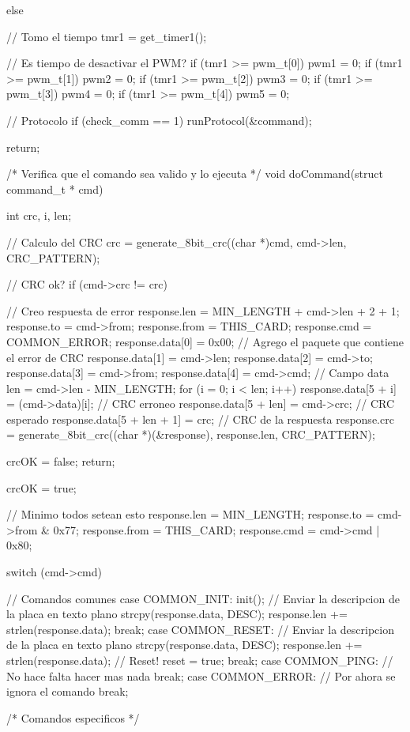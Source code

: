 {\begin{verbatimtab}
{{{		} else {
			// Tomo el tiempo
			tmr1 = get_timer1();

			// Es tiempo de desactivar el PWM?
			if (tmr1 >= pwm_t[0])
				pwm1 = 0;
			if (tmr1 >= pwm_t[1])
				pwm2 = 0;
			if (tmr1 >= pwm_t[2])
				pwm3 = 0;
			if (tmr1 >= pwm_t[3])
				pwm4 = 0;
			if (tmr1 >= pwm_t[4])
				pwm5 = 0;
		}
		
		// Protocolo
		if (check_comm == 1)
			runProtocol(&command);
	}

	return;
}

/* Verifica que el comando sea valido y lo ejecuta */
void doCommand(struct command_t * cmd)
{
	int crc, i, len;
		
	// Calculo del CRC
	crc = generate_8bit_crc((char *)cmd, cmd->len, CRC_PATTERN);
	
	// CRC ok?
	if (cmd->crc != crc)
	{		
		// Creo respuesta de error
		response.len = MIN_LENGTH + cmd->len + 2 + 1;
		response.to = cmd->from;
		response.from = THIS_CARD;
		response.cmd = COMMON_ERROR;
		response.data[0] = 0x00;
		// Agrego el paquete que contiene el error de CRC
		response.data[1] = cmd->len;
		response.data[2] = cmd->to;
		response.data[3] = cmd->from;
		response.data[4] = cmd->cmd;
		// Campo data
		len = cmd->len - MIN_LENGTH;
		for (i = 0; i < len; i++)
			response.data[5 + i] = (cmd->data)[i];
		// CRC erroneo
		response.data[5 + len] = cmd->crc;
		// CRC esperado
		response.data[5 + len + 1] = crc;
		// CRC de la respuesta
		response.crc = generate_8bit_crc((char *)(&response), response.len, CRC_PATTERN);
	
		crcOK = false;
		return;
	}

	crcOK = true;
	
	// Minimo todos setean esto
	response.len = MIN_LENGTH;
	response.to = cmd->from & 0x77;
	response.from = THIS_CARD;
	response.cmd = cmd->cmd | 0x80;

	switch (cmd->cmd)
	{
		// Comandos comunes
		case COMMON_INIT: 
			init();
			// Enviar la descripcion de la placa en texto plano
			strcpy(response.data, DESC);
			response.len += strlen(response.data);
		break;
		case COMMON_RESET: 
			// Enviar la descripcion de la placa en texto plano
			strcpy(response.data, DESC);
			response.len += strlen(response.data);
			// Reset!
			reset = true;
		break;
		case COMMON_PING: 
			// No hace falta hacer mas nada
		break;
 		case COMMON_ERROR:
			// Por ahora se ignora el comando
		break;
		
		/* Comandos especificos */
		
}}
\end{verbatimtab}}
